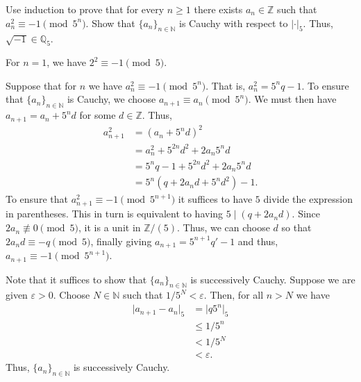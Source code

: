 \documentclass[12 pt, letterpaper]{hmcpset}
\begin{document}
\pagebreak

\begin{problem}[(2)]
	Use induction to prove that for every $n \ge 1$ there exists $a_{n} \in \mathbb{Z}$ such that $a_{n}^{2} \equiv -1 \pmod{5^{n}}$. Show that $\{ a_{n} \}_{n \in \mathbb{N}}$ is Cauchy with respect to $\lvert \cdot \rvert_{5}$. Thus, $\sqrt{-1} \in \mathbb{Q}_{5}$.
\end{problem}

\begin{solution}
	For $n = 1$, we have $2^{2} \equiv -1 \pmod 5$.

	Suppose that for $n$ we have $a_{n}^{2} \equiv -1 \pmod{5^{n}}$. That is, $a_{n}^{2} = 5^{n} q - 1$. To ensure that $\{ a_{n} \}_{n \in \mathbb{N}}$ is Cauchy, we choose $a_{n + 1} \equiv a_{n} \pmod{5^{n}}$. We must then have  $a_{n + 1} = a_{n} + 5^{n} d$ for some $d \in \mathbb{Z}$. Thus,
	\begin{align*}
		a_{n + 1}^{2} & = (a_{n} + 5^{n} d)^{2} \\
			      & = a_{n}^{2} + 5^{2n} d^{2} + 2 a_{n} 5^{n} d \\
			      & = 5^{n} q - 1 + 5^{2n} d^{2} + 2 a_{n} 5^{n} d \\
			      & = 5^{n}(q + 2 a_{n} d + 5^{n} d^{2}) - 1.
	\end{align*}
	To ensure that $a_{n + 1}^{2} \equiv -1 \pmod{5^{n + 1}}$ it suffices to have $5$ divide the expression in parentheses. This in turn is equivalent to having $5 \mid (q + 2 a_{n} d)$. Since $2 a_{n} \not \equiv 0 \pmod{5}$, it is a unit in $\mathbb{Z} / (5)$. Thus, we can choose $d$ so that $2 a_{n} d \equiv -q \pmod 5$, finally giving $a_{n + 1} = 5^{n + 1} q' - 1$ and thus, $a_{n + 1} \equiv -1 \pmod{5^{n + 1}}$.

	Note that it suffices to show that $\{ a_{n} \}_{n \in \mathbb{N}}$ is successively Cauchy. Suppose we are given $\varepsilon > 0$. Choose $N \in \mathbb{N}$ such that $1 / 5^{N} < \varepsilon$. Then, for all $n > N$ we have
	\begin{align*}
		\lvert a_{n + 1} - a_{n} \rvert_{5} & = \lvert q 5^{n} \rvert_{5} \\
						    & \le 1 / 5^{n} \\
						    & < 1 / 5^{N} \\
						    & < \varepsilon.
	\end{align*}
	Thus, $\{ a_{n} \}_{n \in \mathbb{N}}$ is successively Cauchy.
\end{solution}

\pagebreak
\end{document}
